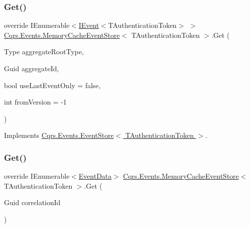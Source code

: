 \subsubsection{\texorpdfstring{Get()}{Get()}\hspace{0.1cm}{\footnotesize\ttfamily [1/2]}}
{\footnotesize\ttfamily override I\+Enumerable$<$\hyperlink{interfaceCqrs_1_1Events_1_1IEvent}{I\+Event}$<$T\+Authentication\+Token$>$ $>$ \hyperlink{classCqrs_1_1Events_1_1MemoryCacheEventStore}{Cqrs.\+Events.\+Memory\+Cache\+Event\+Store}$<$ T\+Authentication\+Token $>$.Get (\begin{DoxyParamCaption}\item[{Type}]{aggregate\+Root\+Type,  }\item[{Guid}]{aggregate\+Id,  }\item[{bool}]{use\+Last\+Event\+Only = {\ttfamily false},  }\item[{int}]{from\+Version = {\ttfamily -\/1} }\end{DoxyParamCaption})\hspace{0.3cm}{\ttfamily [virtual]}}



Implements \hyperlink{classCqrs_1_1Events_1_1EventStore_aa1d0d399a35c1e3b0759e27202695d8b_aa1d0d399a35c1e3b0759e27202695d8b}{Cqrs.\+Events.\+Event\+Store$<$ T\+Authentication\+Token $>$}.

\mbox{\label{classCqrs_1_1Events_1_1MemoryCacheEventStore_a2a93a3f10423f608527fbc41a7ce8cef_a2a93a3f10423f608527fbc41a7ce8cef}} 
\subsubsection{\texorpdfstring{Get()}{Get()}\hspace{0.1cm}{\footnotesize\ttfamily [2/2]}}
{\footnotesize\ttfamily override I\+Enumerable$<$\hyperlink{classCqrs_1_1Events_1_1EventData}{Event\+Data}$>$ \hyperlink{classCqrs_1_1Events_1_1MemoryCacheEventStore}{Cqrs.\+Events.\+Memory\+Cache\+Event\+Store}$<$ T\+Authentication\+Token $>$.Get (\begin{DoxyParamCaption}\item[{Guid}]{correlation\+Id }\end{DoxyParamCaption})\hspace{0.3cm}{\ttfamily [virtual]}}



